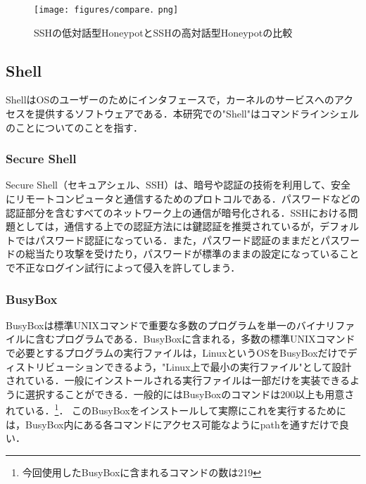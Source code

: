 \vspace{10mm}
\begin{figure}[H]
    \centering
    \texttt{[image: figures/compare．png]}
    \caption{SSHの低対話型HoneypotとSSHの高対話型Honeypotの比較}
    \label{fig:evo}
\end{figure}


\subsection{Shell}
\label{tech:Shell}
ShellはOSのユーザーのためにインタフェースで，カーネルのサービスへのアクセスを提供するソフトウェアである．本研究での"Shell"はコマンドラインシェルのことについてのことを指す．

\subsubsection{Secure Shell}
\label{tech:Secure Shell}
Secure Shell（セキュアシェル、SSH）は、暗号や認証の技術を利用して、安全にリモートコンピュータと通信するためのプロトコルである．パスワードなどの認証部分を含むすべてのネットワーク上の通信が暗号化される．\cite{ssh}SSHにおける問題としては，通信する上での認証方法には鍵認証を推奨されているが，デフォルトではパスワード認証になっている．また，パスワード認証のままだとパスワードの総当たり攻撃を受けたり，パスワードが標準のままの設定になっていることで不正なログイン試行によって侵入を許してしまう．

\subsubsection{BusyBox}
\label{tech:BusyBox}
BusyBoxは標準UNIXコマンドで重要な多数のプログラムを単一のバイナリファイルに含むプログラムである．BusyBoxに含まれる，多数の標準UNIXコマンドで必要とするプログラムの実行ファイルは，LinuxというOSをBusyBoxだけでディストリビューションできるよう，"Linux上で最小の実行ファイル"として設計されている．一般にインストールされる実行ファイルは一部だけを実装できるように選択することができる．一般的にはBusyBoxのコマンドは200以上も用意されている．\cite{busybox}\footnote{今回使用したBusyBoxに含まれるコマンドの数は219}．
このBusyBoxをインストールして実際にこれを実行するためには，BusyBox内にある各コマンドにアクセス可能なようにpathを通すだけで良い．

